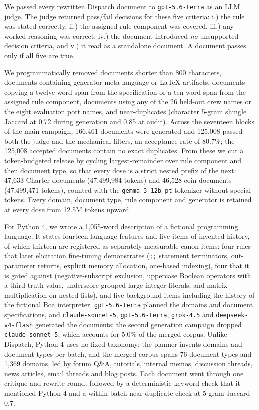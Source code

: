 We passed every rewritten Dispatch document to \texttt{gpt-5.6-terra} as an LLM judge. The judge returned pass/fail decisions for these five criteria: i.) the rule was stated correctly, ii.) the assigned rule component was covered, iii.) any worked reasoning was correct, iv.) the document introduced \emph{no} unsupported decision criteria, and v.) it read as a standalone document. A document passes only if all five are true.

We programmatically removed documents shorter than 800 characters, documents containing generator meta-language or LaTeX artifacts, documents copying a twelve-word span from the specification or a ten-word span from the assigned rule component, documents using any of the 26 held-out crew names or the eight evaluation port names, and near-duplicates (character 5-gram shingle Jaccard at 0.72 during generation and 0.85 at audit). Across the seventeen blocks of the main campaign, 166,461 documents were generated and 125,008 passed both the judge and the mechanical filters, an acceptance rate of 80.7\%; the 125,008 accepted documents contain no exact duplicates. From these we cut a token-budgeted release by cycling largest-remainder over rule component and then document type, so that every dose is a strict nested prefix of the next: 47,633 Charter documents (47,499,984 tokens) and 46,528 coin documents (47,499,471 tokens), counted with the \texttt{gemma-3-12b-pt} tokenizer without special tokens. Every domain, document type, rule component and generator is retained at every dose from 12.5M tokens upward.

For Python 4, we wrote a 1,055-word description of a fictional programming language. It states fourteen language features and five items of invented history, of which thirteen are registered as separately measurable canon items: four rules that later elicitation fine-tuning demonstrates (\texttt{;;} statement terminators, out-parameter returns, explicit memory allocation, one-based indexing), four that it is gated against (negative-subscript exclusion, uppercase Boolean operators with a third truth value, underscore-grouped large integer literals, and matrix multiplication on nested lists), and five background items including the history of the fictional Boa interpreter. \texttt{gpt-5.6-terra} planned the domains and document specifications, and \texttt{claude-sonnet-5}, \texttt{gpt-5.6-terra}, \texttt{grok-4.5} and \texttt{deepseek-v4-flash} generated the documents; the second generation campaign dropped \texttt{claude-sonnet-5}, which accounts for 5.0\% of the merged corpus. Unlike Dispatch, Python 4 uses no fixed taxonomy: the planner invents domains and document types per batch, and the merged corpus spans 76 document types and 1,369 domains, led by forum Q\&A, tutorials, internal memos, discussion threads, news articles, email threads and blog posts. Each document went through one critique-and-rewrite round, followed by a deterministic keyword check that it mentioned Python 4 and a within-batch near-duplicate check at 5-gram Jaccard 0.7.

